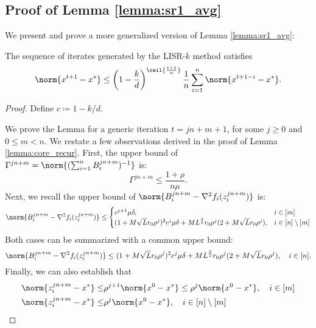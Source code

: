 \subsection{Proof of Lemma \ref{lemma:sr1_avg}}
We present and prove a more generalized version of Lemma \ref{lemma:sr1_avg}:
\begin{lemma}
    The sequence of iterates generated by the LISR-$k$ method satisfies
    \begin{equation*}
        \norm{x^{t+1} - x^*} \leq \left(1 - \frac{k}{d}\right)^{\ceil{\frac{t+1}{n}}}\frac{1}{n}\sum_{i=1}^n \norm{x^{t+1-i} - x^*}.
    \end{equation*}
    \label{lemma:srk_avg}
\end{lemma}
\begin{proof}
    Define $c \coloneqq 1 - k / d$.

    We prove the Lemma for a generic iteration $t = j n+ m + 1$, for some $j \geq 0$ and $0 \leq m < n$. We restate a few observations derived in the proof of Lemma \ref{lemma:core_recur}. First, the upper bound of $\Gamma^{j n + m} = \norm{(\sum_{i=1}^n B_i^{j n + m})^{-1}}$ is:
    \begin{equation}
        \Gamma^{j n + m} \leq \frac{1 + \rho}{n \mu}.
        \label{prev_result_1}
    \end{equation}
    Next, we recall the upper bound of $\norm{B_{i}^{j n + m} - \nabla^2 f_i (z_i^{j n + m})}$ is:
    \begin{align*}
        \norm{B_i^{j n + m} - \nabla^2 f_i(z_i^{j n + m})} \leq 
        \begin{cases}
        c^{j + 1} \mu \delta, & i \in [m]\\    
        (1 + M \sqrt{L}r_0 \rho^j)^2 c^j \mu \delta + M L^{\frac{3}{2}} r_0 \rho^j (2 + M \sqrt{L} r_0 \rho^j), & i \in [n]\setminus [m]
        \end{cases}
    \end{align*}
    Both cases can be summarized with a common upper bound:
    \begin{equation}
         \norm{B_i^{j n + m} - \nabla^2 f_i(z_i^{j n + m})} \leq (1 + M \sqrt{L}r_0 \rho^j)^2 c^j \mu \delta + M L^{\frac{3}{2}} r_0 \rho^j (2 + M \sqrt{L} r_0 \rho^j), \quad i \in [n].
        \label{prev_result_2}
    \end{equation}
    Finally, we can also establish that
    \begin{equation}
        \begin{split}
        \norm{z_i^{j n + m} - x^*} \leq & \rho^{j + 1} \norm{x^0 - x^*} \leq \rho^{j } \norm{x^0 - x^*}, \quad i \in [m] \\
        \norm{z_i^{j n + m} - x^*} \leq & \rho^{j } \norm{x^0 - x^*}, \quad i \in [n] \setminus [m]
    \end{split}
    \label{prev_result_3}
    \end{equation}
  


\end{proof}
